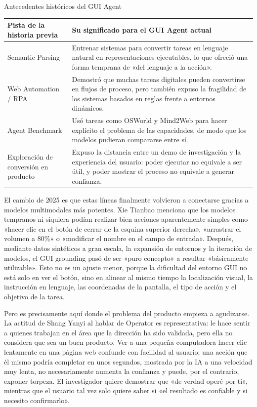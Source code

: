 \begin{knowledgebox}{Antecedentes históricos del GUI Agent}
\begin{tabularx}{\textwidth}{>{\raggedright\arraybackslash}p{} Y}
\toprule
Pista de la historia previa & Su significado para el GUI Agent actual \\
\midrule
Semantic Parsing & Entrenar sistemas para convertir tareas en lenguaje natural en representaciones ejecutables, lo que ofreció una forma temprana de «del lenguaje a la acción». \\
Web Automation / RPA & Demostró que muchas tareas digitales pueden convertirse en flujos de proceso, pero también expuso la fragilidad de los sistemas basados en reglas frente a entornos dinámicos. \\
Agent Benchmark & Usó tareas como OSWorld y Mind2Web para hacer explícito el problema de las capacidades, de modo que los modelos pudieran compararse entre sí. \\
Exploración de conversión en producto & Expuso la distancia entre un demo de investigación y la experiencia del usuario: poder ejecutar no equivale a ser útil, y poder mostrar el proceso no equivale a generar confianza. \\
\bottomrule
\end{tabularx}
\end{knowledgebox}

El cambio de 2025 es que estas líneas finalmente volvieron a conectarse gracias a modelos multimodales más potentes. Xie Tianbao menciona que los modelos tempranos ni siquiera podían realizar bien acciones aparentemente simples como «hacer clic en el botón de cerrar de la esquina superior derecha», «arrastrar el volumen a 80\%» o «modificar el nombre en el campo de entrada». Después, mediante datos sintéticos a gran escala, la expansión de entornos y la iteración de modelos, el GUI grounding pasó de ser «puro concepto» a resultar «básicamente utilizable». Esto no es un ajuste menor, porque la dificultad del entorno GUI no está solo en ver el botón, sino en alinear al mismo tiempo la localización visual, la instrucción en lenguaje, las coordenadas de la pantalla, el tipo de acción y el objetivo de la tarea.

Pero es precisamente aquí donde el problema del producto empieza a agudizarse. La actitud de Shang Yanyi al hablar de Operator es representativa: le hace sentir a quienes trabajan en el área que la dirección ha sido validada, pero ella no considera que sea un buen producto. Ver a una pequeña computadora hacer clic lentamente en una página web confunde con facilidad al usuario; una acción que él mismo podría completar en unos segundos, mostrada por la IA a una velocidad muy lenta, no necesariamente aumenta la confianza y puede, por el contrario, exponer torpeza. El investigador quiere demostrar que «de verdad operé por ti», mientras que el usuario tal vez solo quiere saber si «el resultado es confiable y si necesito confirmarlo».

